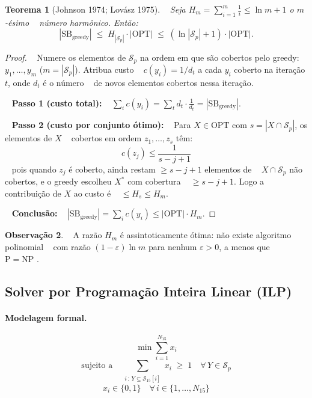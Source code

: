 \documentclass[12pt,a4paper]{article}
\newtheorem{theorem}{Teorema}[section]
\theoremstyle{definition}
\newtheorem{remark}[theorem]{Observação}
\newcommand{\SB}{\mathrm{SB}}
\newcommand{\OPT}{\mathrm{OPT}}
\newcommand{\Harm}[1]{H_{#1}}
\begin{document}
\begin{theorem}[Johnson 1974; Lovász 1975]\label{thm:approx}
  Seja $\Harm{m} = \sum_{i=1}^{m} \frac{1}{i} \leq \ln m + 1$ o $m$-ésimo
  número harmônico. Então:
  \[
    |\SB_{\text{greedy}}| \;\leq\; \Harm{|\mathcal{S}_p|} \cdot |\OPT|
    \;\leq\; (\ln|\mathcal{S}_p| + 1) \cdot |\OPT|.
  \]
\end{theorem}
\begin{proof}
  Numere os elementos de $\mathcal{S}_p$ na ordem em que são cobertos pelo greedy:
  $y_1, \ldots, y_m$ ($m = |\mathcal{S}_p|$). Atribua custo
  $c(y_i) = 1/d_t$ a cada $y_i$ coberto na iteração $t$, onde $d_t$ é o número
  de novos elementos cobertos nessa iteração.

  \textbf{Passo 1 (custo total):}
  $\sum_i c(y_i) = \sum_t d_t \cdot \frac{1}{d_t} = |\SB_{\text{greedy}}|$.

  \textbf{Passo 2 (custo por conjunto ótimo):}
  Para $X \in \OPT$ com $s = |X \cap \mathcal{S}_p|$, os elementos de $X$
  cobertos em ordem $z_1, \ldots, z_s$ têm:
  \[
    c(z_j) \leq \frac{1}{s - j + 1}
  \]
  pois quando $z_j$ é coberto, ainda restam $\geq s - j + 1$ elementos de
  $X \cap \mathcal{S}_p$ não cobertos, e o greedy escolheu $X^*$ com cobertura
  $\geq s - j + 1$. Logo a contribuição de $X$ ao custo é
  $\leq \Harm{s} \leq \Harm{m}$.

  \textbf{Conclusão:}
  $|\SB_{\text{greedy}}| = \sum_i c(y_i) \leq |\OPT| \cdot \Harm{m}$. \qedhere
\end{proof}

\begin{remark}
  A razão $\Harm{m}$ é assintoticamente ótima: não existe algoritmo polinomial
  com razão $(1-\varepsilon)\ln m$ para nenhum $\varepsilon > 0$, a menos que
  $\mathrm{P} = \mathrm{NP}$ \cite{feige1998}.
\end{remark}

\subsection{Solver por Programação Inteira Linear (ILP)}

\paragraph{Modelagem formal.}
\[
  \min \sum_{i=1}^{N_{15}} x_i
\]
\[
  \text{sujeito a} \quad
  \sum_{\substack{i \,:\, Y \subseteq \mathcal{S}_{15}[i]}} x_i \;\geq\; 1
  \quad \forall\, Y \in \mathcal{S}_p
\]
\[
  x_i \in \{0, 1\} \quad \forall\, i \in \{1, \ldots, N_{15}\}
\]
\end{document}
